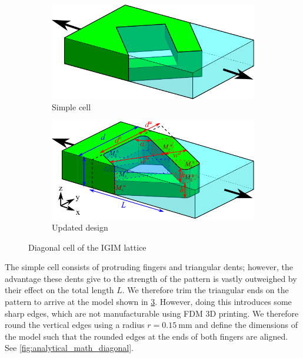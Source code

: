 \begin{figure}
	\centering
	\begin{subfigure}[B]{.49\columnwidth}
		\centering
		\includegraphics[width=\columnwidth]{sources/method/diagonal_model_simple_v5.pdf}
		\caption{Simple cell}
		\label{fig:diagonal_model_simple}
	\end{subfigure}
	\begin{subfigure}[B]{.7\columnwidth}
		\centering
		\includegraphics[width=\columnwidth]{sources/method/diagonal_model_v5.pdf}
		\caption{Updated design}
		\label{fig:diagonal_model}
	\end{subfigure}
	\caption{Diagonal cell of the IGIM lattice}
\end{figure}


The simple cell consists of protruding fingers and triangular dents;
however, the advantage these dents give to the strength of the pattern is vastly outweighed by their effect on the total length $L$.
We therefore trim the triangular ends on the pattern to arrive at the model shown in \cref{fig:diagonal_model}.
However, doing this introduces some sharp edges, which are not manufacturable using FDM 3D printing.
We therefore round the vertical edges using a radius $r=\SI{0.15}{\milli\meter}$
and define the dimensions of the model such that the rounded edges at the ends of both fingers are aligned.
See \cref{fig:analytical_math_diagonal}.


